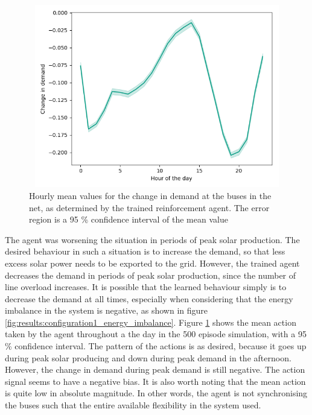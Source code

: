 \documentclass[class=book, crop=false, 11pt]{standalone}
\begin{document}
\begin{figure}[h]
    \center
\includegraphics[height=8cm, width=12cm]{figures/config1_action_hour.png}
    \caption {Hourly mean values for the change in demand at the buses in the net, as determined by the trained reinforcement agent. The error region is a 95 \% confidence interval of the mean value}
    \label{fig:discussion:config1_action_hour}
\end{figure}

The agent was worsening the situation in periods of peak solar production. The desired behaviour in such a situation is to increase the demand, so that less excess solar power needs to be exported to the grid. However, the trained agent decreases the demand in periods of peak solar production, since the number of line overload increases. It is possible that the learned behaviour simply is to decrease the demand at all times, especially when considering that the energy imbalance in the system is negative, as shown in figure \ref{fig:results:configuration1_energy_imbalance}. Figure \ref{fig:discussion:config1_action_hour} shows the mean action taken by the agent throughout a the day in the 500 episode simulation, with a 95 \% confidence interval. The pattern of the actions is as desired, because it goes up during peak solar producing and down during peak demand in the afternoon. However, the change in demand during peak demand is still negative. The action signal seems to have a negative bias. It is also worth noting that the mean action is quite low in absolute magnitude. In other words, the agent is not synchronising the buses such that the entire available flexibility in the system used.
\end{document}
